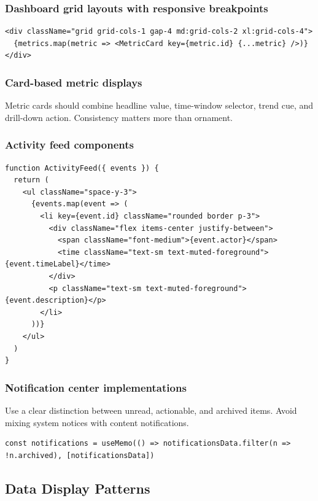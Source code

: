 \subsubsection{Dashboard grid layouts with responsive breakpoints}
\begin{verbatim}
<div className="grid grid-cols-1 gap-4 md:grid-cols-2 xl:grid-cols-4">
  {metrics.map(metric => <MetricCard key={metric.id} {...metric} />)}
</div>
\end{verbatim}

\subsubsection{Card-based metric displays}
Metric cards should combine headline value, time-window selector, trend cue, and drill-down action. Consistency matters more than ornament.

\subsubsection{Activity feed components}
\begin{verbatim}
function ActivityFeed({ events }) {
  return (
    <ul className="space-y-3">
      {events.map(event => (
        <li key={event.id} className="rounded border p-3">
          <div className="flex items-center justify-between">
            <span className="font-medium">{event.actor}</span>
            <time className="text-sm text-muted-foreground">{event.timeLabel}</time>
          </div>
          <p className="text-sm text-muted-foreground">{event.description}</p>
        </li>
      ))}
    </ul>
  )
}
\end{verbatim}

\subsubsection{Notification center implementations}
Use a clear distinction between unread, actionable, and archived items. Avoid mixing system notices with content notifications.

\begin{verbatim}
const notifications = useMemo(() => notificationsData.filter(n => !n.archived), [notificationsData])
\end{verbatim}

\subsection{Data Display Patterns}

